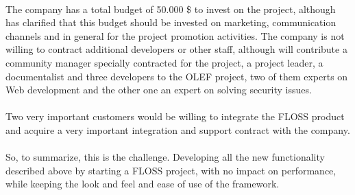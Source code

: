 \documentclass[11pt]{article}
\begin{document}
\\
The company has a total budget of 50.000 \$ to invest on the project, although has clarified that this budget should be invested on marketing, communication channels and in general for the project promotion activities. The company is not willing to contract additional developers or other staff, although will contribute a community manager specially contracted for the project, a project leader, a documentalist and three developers to the OLEF project, two of them experts on Web development and the other one an expert on solving security issues.
\\
\\Two very important customers would be willing to integrate the FLOSS product and acquire a very important integration and support contract with the company.\\
\\
So, to summarize, this is the challenge. Developing all the new functionality described above by starting a FLOSS project, with no impact on performance, while keeping the look and feel and ease of use of the framework.

\pagebreak
\end{document}
